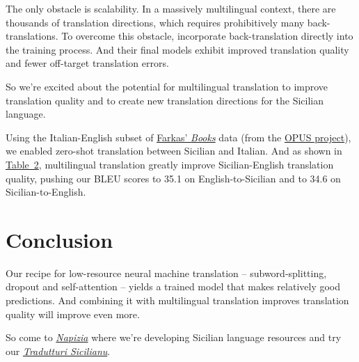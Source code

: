 \documentclass[10pt,letterpaper]{article}
\begin{document}
The only obstacle is scalability.  In a massively multilingual context, there are thousands of
translation directions, which requires prohibitively many back-translations.  To overcome this obstacle,
\citeauthor{zhang2020improving} incorporate back-translation directly into the training process.
And their final models exhibit improved translation quality and fewer off-target translation errors.

So we're excited about the potential for multilingual translation to improve translation quality and
to create new translation directions for the Sicilian language.

Using the Italian-English subset of
\href{https://farkastranslations.com/bilingual_books.php}{Farkas' \textit{Books}} data
(from the \href{https://opus.nlpl.eu/}{OPUS project}),
we enabled zero-shot translation between Sicilian and Italian.
And as shown in \hyperlink{bleuscores}{Table~2}, %
multilingual translation greatly improve Sicilian-English translation quality,
pushing our BLEU scores to 35.1 on English-to-Sicilian and to 34.6 on Sicilian-to-English.



\hypertarget{conclusion}{}

\section*{Conclusion}

Our recipe for low-resource neural machine translation -- subword-splitting,
dropout and self-attention -- yields a trained model that makes relatively good predictions.
And combining it with multilingual translation improves translation quality will improve even more.

So come to \textit{\href{https://www.napizia.com/}{Napizia}}
where we're developing Sicilian language resources
and try our \textit{\href{https://translate.napizia.com/}{Tradutturi Sicilianu}}.



\hypertarget{bibliography}{}




\end{document}
